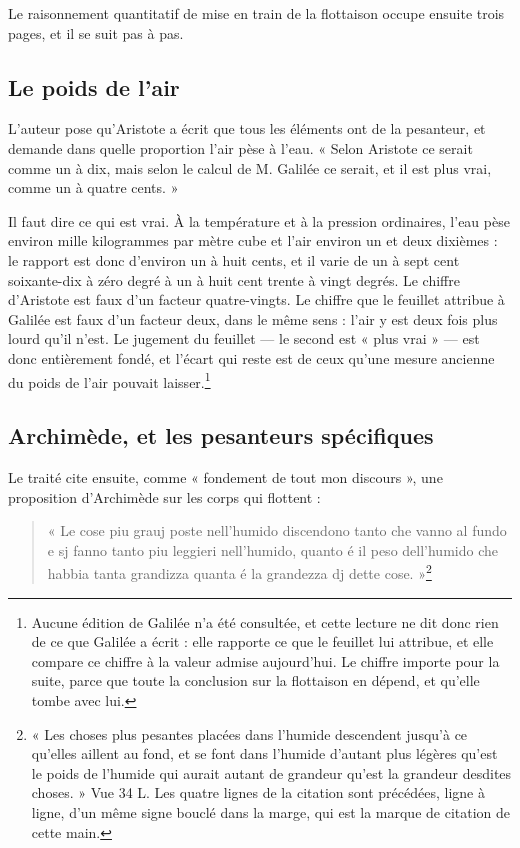 \documentclass[11pt,a4paper]{article}
\begin{document}
Le raisonnement quantitatif de mise en train de la flottaison occupe ensuite
trois pages, et il se suit pas à pas.

\subsection*{Le poids de l'air}

L'auteur pose qu'Aristote a écrit que tous les éléments ont de la pesanteur, et
demande dans quelle proportion l'air pèse à l'eau. « Selon Aristote ce serait
comme un à dix, mais selon le calcul de M. Galilée ce serait, et il est plus
vrai, comme un à quatre cents. »

Il faut dire ce qui est vrai. À la température et à la pression ordinaires,
l'eau pèse environ mille kilogrammes par mètre cube et l'air environ un et deux
dixièmes : le rapport est donc d'environ un à huit cents, et il varie de un à
sept cent soixante-dix à zéro degré à un à huit cent trente à vingt degrés. Le
chiffre d'Aristote est faux d'un facteur quatre-vingts. Le chiffre que le
feuillet attribue à Galilée est faux d'un facteur deux, dans le même sens :
l'air y est deux fois plus lourd qu'il n'est. Le jugement du feuillet — le second
est « plus vrai » — est donc entièrement fondé, et l'écart qui reste est de ceux
qu'une mesure ancienne du poids de l'air pouvait laisser.\footnote{Aucune
édition de Galilée n'a été consultée, et cette lecture ne dit donc rien de ce
que Galilée a écrit : elle rapporte ce que le feuillet lui attribue, et elle
compare ce chiffre à la valeur admise aujourd'hui. Le chiffre importe pour la
suite, parce que toute la conclusion sur la flottaison en dépend, et qu'elle
tombe avec lui.}

\subsection*{Archimède, et les pesanteurs spécifiques}

Le traité cite ensuite, comme « fondement de tout mon discours », une proposition
d'Archimède sur les corps qui flottent :

\begin{quote}
« Le cose piu grauj poste nell'humido discendono tanto che vanno al fundo e sj
fanno tanto piu leggieri nell'humido, quanto é il peso dell'humido che habbia
tanta grandizza quanta é la grandezza dj dette cose. »\footnote{« Les choses plus
pesantes placées dans l'humide descendent jusqu'à ce qu'elles aillent au fond,
et se font dans l'humide d'autant plus légères qu'est le poids de l'humide qui
aurait autant de grandeur qu'est la grandeur desdites choses. » Vue 34 L. Les
quatre lignes de la citation sont précédées, ligne à ligne, d'un même signe
bouclé dans la marge, qui est la marque de citation de cette main.}
\end{quote}
\end{document}
